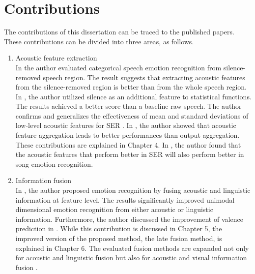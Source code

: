 \section{Contributions}
The contributions of this dissertation can be traced to the published papers.
These contributions can be divided into three areas, as follows.
\begin{enumerate}
\item Acoustic feature extraction \\
In \cite{Atmaja2019} the author evaluated categorical speech emotion
recognition from silence-removed speech region. The result suggests that
extracting acoustic features from the silence-removed region is better than
from the whole speech region. In \cite{Atmaja2020f}, the author utilized
silence as an additional feature to statistical functions. The results achieved
a better score than a baseline raw speech. The author confirms and generalizes
the effectiveness of mean and standard deviations of low-level acoustic
features for SER \cite{Atmaja2020f, Atmaja2020d}. In \cite{Atmaja2020h}, the
author showed that acoustic feature aggregation leads to better performances
than output aggregation. These contributions are explained in Chapter 4. In
\cite{Atmaja2020j}, the author found that the acoustic features that perform
better in SER will also perform better in song emotion recognition.

\item Information fusion \\
In \cite{Atmaja2019b, Atmaja2020d, Atmaja2020h}, the author proposed emotion
recognition by fusing acoustic and linguistic information at feature level. The
results significantly improved unimodal dimensional emotion recognition from
either acoustic or linguistic information. Furthermore, the author discussed the
improvement of valence prediction in \cite{Atmaja2020e}. While this
contribution is discussed in Chapter 5, the improved version of the proposed
method, the late fusion method, is explained in Chapter 6. The evaluated fusion
methods are expanded not only for acoustic and linguistic fusion but also for
acoustic and visual information fusion \cite{Atmaja2020, Elbarougy2020}. 


\end{enumerate}
